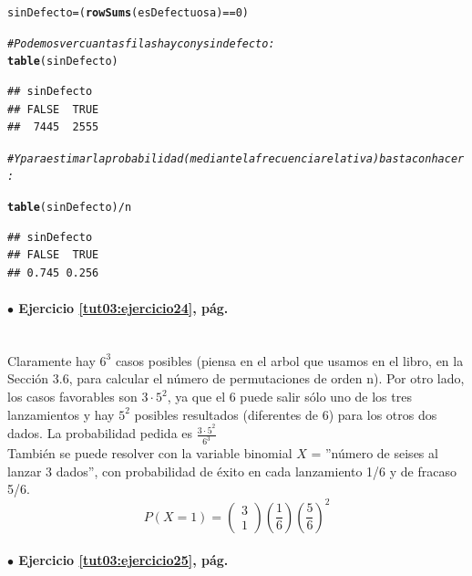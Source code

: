 \documentclass[10pt,a4paper]{article}\usepackage[]{graphicx}\usepackage[]{color}
\makeatletter
\newcommand{\hlnum}[1]{\textcolor[rgb]{0.686,0.059,0.569}{#1}}%
\newcommand{\hlcom}[1]{\textcolor[rgb]{0.678,0.584,0.686}{\textit{#1}}}%
\newcommand{\hlopt}[1]{\textcolor[rgb]{0,0,0}{#1}}%
\newcommand{\hlstd}[1]{\textcolor[rgb]{0.345,0.345,0.345}{#1}}%
\newcommand{\hlkwb}[1]{\textcolor[rgb]{0.69,0.353,0.396}{#1}}%
\newcommand{\hlkwd}[1]{\textcolor[rgb]{0.737,0.353,0.396}{\textbf{#1}}}%
\newenvironment{kframe}{%
 \def\at@end@of@kframe{}%
 \ifinner\ifhmode%
  \def\at@end@of@kframe{\end{minipage}}%
  \begin{minipage}{\columnwidth}%
 \fi\fi%
 \def\FrameCommand##1{\hskip\@totalleftmargin \hskip-\fboxsep
 \colorbox{shadecolor}{##1}\hskip-\fboxsep
     \hskip-\linewidth \hskip-\@totalleftmargin \hskip\columnwidth}%
 \MakeFramed {\advance\hsize-\width
   \@totalleftmargin\z@ \linewidth\hsize
   \@setminipage}}%
 {\par\unskip\endMakeFramed%
 \at@end@of@kframe}
\newenvironment{knitrout}{}{} %
\makeatother
\begin{document}
\begin{knitrout}
\begin{kframe}
\begin{alltt}
\hlstd{sinDefecto} \hlkwb{=} \hlstd{(}\hlkwd{rowSums}\hlstd{(esDefectuosa)} \hlopt{==} \hlnum{0}\hlstd{)}

\hlcom{# Podemos ver cuantas filas hay con y sin defecto:}
\hlkwd{table}\hlstd{(sinDefecto)}
\end{alltt}
\begin{verbatim}
## sinDefecto
## FALSE  TRUE 
##  7445  2555
\end{verbatim}
\begin{alltt}
\hlcom{# Y para estimar la probabilidad (mediante la frecuencia relativa) basta con hacer:}

\hlkwd{table}\hlstd{(sinDefecto)} \hlopt{/} \hlstd{n}
\end{alltt}
\begin{verbatim}
## sinDefecto
## FALSE  TRUE 
## 0.745 0.256
\end{verbatim}
\end{kframe}
\end{knitrout}


\paragraph{\bf $\bullet$ Ejercicio \ref{tut03:ejercicio24}, pág. \pageref{tut03:ejercicio24}}
\label{tut03:ejercicio24:sol}\quad\\

Claramente hay $6^3$ casos posibles (piensa en el arbol que usamos en el libro, en la Sección 3.6,  para calcular el número de permutaciones de orden n). 
Por otro lado, los casos favorables son $3·5^2$, 
ya que el 6 puede salir sólo uno de los tres lanzamientos y  hay $5^2$ posibles resultados (diferentes de 6) para los otros dos dados. La probabilidad pedida es $\frac{3·5^2}{6^3}$\\

También se puede resolver con la variable binomial $X$ = ''número de seises al lanzar 3 dados'', con probabilidad de éxito en cada lanzamiento 1/6 y de fracaso 5/6.
$$ P(X=1)=\left(\begin{array}{c}
3\\
1
\end{array}
\right) \left(\frac{1}{6}\right)\left(\frac{5}{6}\right)^2$$

\paragraph{\bf $\bullet$ Ejercicio \ref{tut03:ejercicio25}, pág. \pageref{tut03:ejercicio25}}
\label{tut03:ejercicio25:sol}
\end{document}
